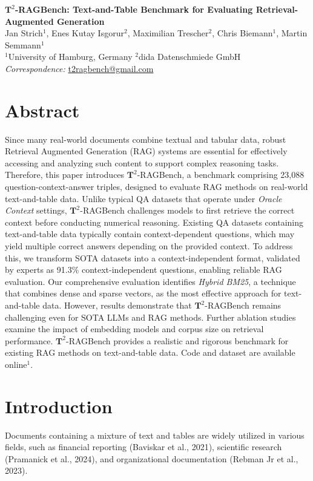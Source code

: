 \documentclass[10pt]{article}
\begin{document}
\begin{center}
{\LARGE\bfseries $\mathbf{T}^{2}$-RAGBench: Text-and-Table Benchmark for Evaluating Retrieval-Augmented Generation}\\[6pt]
Jan Strich$^{1}$, Enes Kutay Isgorur$^{2}$, Maximilian Trescher$^{2}$, Chris Biemann$^{1}$, Martin Semmann$^{1}$\\[4pt]
$^{1}$University of Hamburg, Germany \quad $^{2}$dida Datenschmiede GmbH\\[4pt]
\textit{Correspondence:} \href{mailto:t2ragbench@gmail.com}{t2ragbench@gmail.com}
\end{center}

\section*{Abstract}
Since many real-world documents combine textual and tabular data, robust Retrieval Augmented Generation (RAG) systems are essential for effectively accessing and analyzing such content to support complex reasoning tasks. Therefore, this paper introduces $\mathbf{T}^2$-RAGBench, a benchmark comprising 23,088 question-context-answer triples, designed to evaluate RAG methods on real-world text-and-table data. Unlike typical QA datasets that operate under \textit{Oracle Context} settings, $\mathbf{T}^2$-RAGBench challenges models to first retrieve the correct context before conducting numerical reasoning. Existing QA datasets containing text-and-table data typically contain context-dependent questions, which may yield multiple correct answers depending on the provided context. To address this, we transform SOTA datasets into a context-independent format, validated by experts as 91.3\% context-independent questions, enabling reliable RAG evaluation. Our comprehensive evaluation identifies \textit{Hybrid BM25}, a technique that combines dense and sparse vectors, as the most effective approach for text-and-table data. However, results demonstrate that $\mathbf{T}^2$-RAGBench remains challenging even for SOTA LLMs and RAG methods. Further ablation studies examine the impact of embedding models and corpus size on retrieval performance. $\mathbf{T}^2$-RAGBench provides a realistic and rigorous benchmark for existing RAG methods on text-and-table data. Code and dataset are available online$^1$.

\section{Introduction}
Documents containing a mixture of text and tables are widely utilized in various fields, such as financial reporting (Baviskar et al., 2021), scientific research (Pramanick et al., 2024), and organizational documentation (Rebman Jr et al., 2023).
\end{document}
